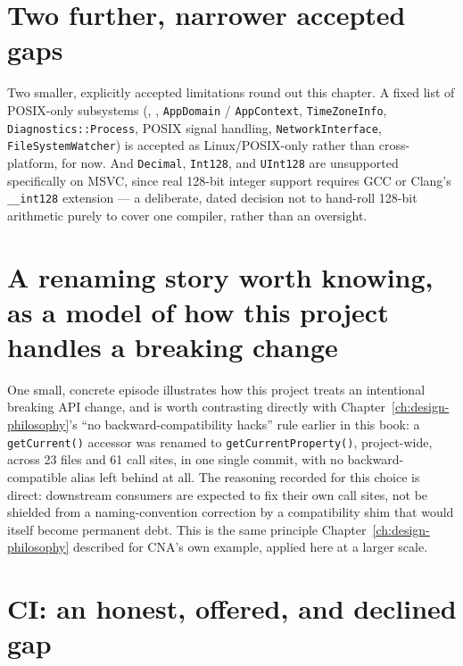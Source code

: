 \section{Two further, narrower accepted gaps}

Two smaller, explicitly accepted limitations round out this chapter. A fixed list of
POSIX-only subsystems (, ,
\texttt{AppDomain} / \texttt{AppContext}, \texttt{TimeZoneInfo}, \texttt{Diagnostics::Process},
POSIX signal handling, \texttt{NetworkInterface}, \texttt{FileSystemWatcher}) is accepted as
Linux/POSIX-only rather than cross-platform, for now. And \texttt{Decimal}, \texttt{Int128},
and \texttt{UInt128} are unsupported specifically on MSVC, since real 128-bit integer support
requires GCC or Clang's \texttt{\_\_int128} extension --- a deliberate, dated decision not to
hand-roll 128-bit arithmetic purely to cover one compiler, rather than an oversight.

\section{A renaming story worth knowing, as a model of how this project handles a breaking change}

One small, concrete episode illustrates how this project treats an intentional breaking API
change, and is worth contrasting directly with Chapter~\ref{ch:design-philosophy}'s ``no
backward-compatibility hacks'' rule earlier in this book: a \texttt{getCurrent()} accessor was renamed
to \texttt{getCurrentProperty()}, project-wide, across 23 files and 61 call sites, in one
single commit, with no backward-compatible alias left behind at all. The reasoning recorded
for this choice is direct: downstream consumers are expected to fix their own call sites, not
be shielded from a naming-convention correction by a compatibility shim that would itself
become permanent debt. This is the same principle Chapter~\ref{ch:design-philosophy}
described for CNA's own  example, applied here at a larger
scale.

\section{CI: an honest, offered, and declined gap}

